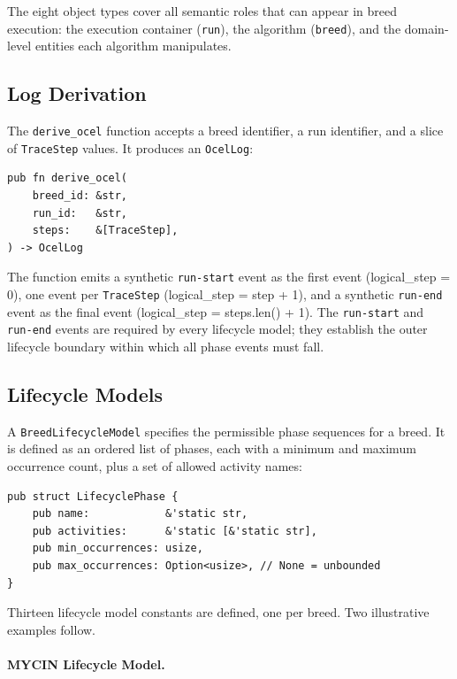 The eight object types cover all semantic roles that can appear in breed execution: the execution container (\texttt{run}), the algorithm (\texttt{breed}), and the domain-level entities each algorithm manipulates.

\subsection{Log Derivation}

The \texttt{derive\_ocel} function accepts a breed identifier, a run identifier, and a slice of \texttt{TraceStep} values. It produces an \texttt{OcelLog}:

\begin{verbatim}
pub fn derive_ocel(
    breed_id: &str,
    run_id:   &str,
    steps:    &[TraceStep],
) -> OcelLog
\end{verbatim}

The function emits a synthetic \texttt{run-start} event as the first event (logical\_step = 0), one event per \texttt{TraceStep} (logical\_step = step + 1), and a synthetic \texttt{run-end} event as the final event (logical\_step = steps.len() + 1). The \texttt{run-start} and \texttt{run-end} events are required by every lifecycle model; they establish the outer lifecycle boundary within which all phase events must fall.

\subsection{Lifecycle Models}

A \texttt{BreedLifecycleModel} specifies the permissible phase sequences for a breed. It is defined as an ordered list of phases, each with a minimum and maximum occurrence count, plus a set of allowed activity names:

\begin{verbatim}
pub struct LifecyclePhase {
    pub name:            &'static str,
    pub activities:      &'static [&'static str],
    pub min_occurrences: usize,
    pub max_occurrences: Option<usize>, // None = unbounded
}
\end{verbatim}

Thirteen lifecycle model constants are defined, one per breed. Two illustrative examples follow.

\paragraph{MYCIN Lifecycle Model.}

